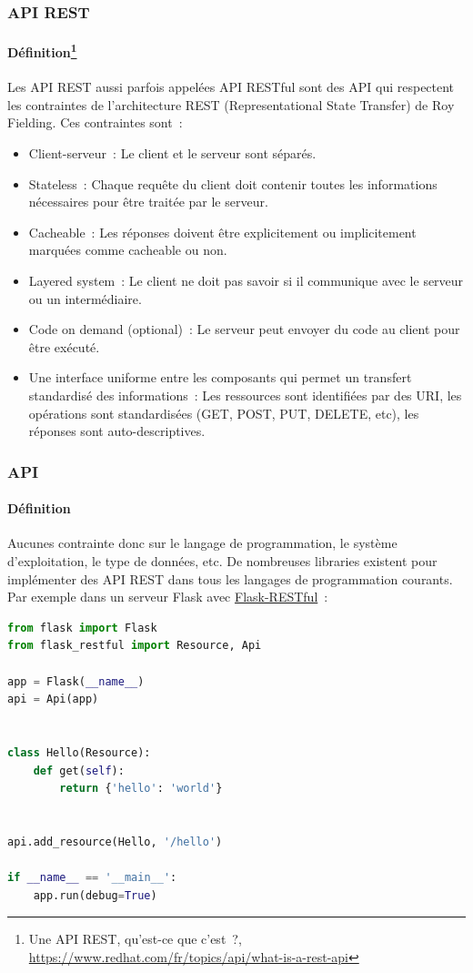 \documentclass{beamer}
\begin{document}
    \begin{frame}
        \transdissolve
        \frametitle{API REST}
        \framesubtitle{Définition\footnote{Une API REST, qu'est-ce que c'est~?, \url{https://www.redhat.com/fr/topics/api/what-is-a-rest-api}}}
        Les API REST aussi parfois appelées API RESTful sont des API qui respectent les contraintes de l'architecture REST (Representational State Transfer) de Roy Fielding.
        \bigbreak
        Ces contraintes sont~:
        \begin{footnotesize}
            \begin{itemize}
                \item Client-serveur~: Le client et le serveur sont séparés.
                \item Stateless~: Chaque requête du client doit contenir toutes les informations nécessaires pour être traitée par le serveur.
                \item Cacheable~: Les réponses doivent être explicitement ou implicitement marquées comme cacheable ou non.
                \item Layered system~: Le client ne doit pas savoir si il communique avec le serveur ou un intermédiaire.
                \item Code on demand (optional)~: Le serveur peut envoyer du code au client pour être exécuté.
                \item Une interface uniforme entre les composants qui permet un transfert standardisé des informations~: Les ressources sont identifiées par des URI, les opérations sont standardisées (GET, POST, PUT, DELETE, etc), les réponses sont auto-descriptives.
            \end{itemize}
        \end{footnotesize}
    \end{frame}

    \begin{frame}[fragile]
        \transdissolve
        \frametitle{API}
        \framesubtitle{Définition}
        Aucunes contrainte donc sur le langage de programmation, le système d'exploitation, le type de données, etc.
        \bigbreak
        De nombreuses libraries existent pour implémenter des API REST dans tous les langages de programmation courants.
        \bigbreak
        Par exemple dans un serveur Flask avec \href{}{Flask-RESTful}~:
        \begin{lstlisting}[language=python,basicstyle=\ttfamily\tiny]
from flask import Flask
from flask_restful import Resource, Api

app = Flask(__name__)
api = Api(app)


class Hello(Resource):
    def get(self):
        return {'hello': 'world'}


api.add_resource(Hello, '/hello')

if __name__ == '__main__':
    app.run(debug=True)
        \end{lstlisting}
    \end{frame}
\end{document}
